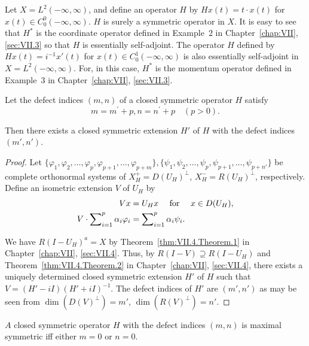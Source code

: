\begin{example}\label{ex:XI.15.Example.2} Let $X = L^2(-\infty, \infty)$, and define an operator $H$ by $Hx(t) = t \cdot x(t)$ for $x(t) \in C_0^0(-\infty, \infty)$. $H$ is surely a symmetric operator in $X$. It is easy to see that $H^*$ is the coordinate operator defined in Example~\hyperref[ex:VII.3.Example.2]{$2$} in Chapter~\ref{chap:VII}, \ref{sec:VII.3} so that $H$ is essentially self-adjoint. The operator $H$ defined by $Hx(t) = i^{-1}x'(t)$ for $x(t) \in C_0^1(-\infty, \infty)$ is also essentially self-adjoint in $X = L^2(-\infty, \infty)$. For, in this case, $H^*$ is the momentum operator defined in Example~\hyperref[ex:VII.3.Example.3]{$3$} in Chapter~\ref{chap:VII}, \ref{sec:VII.3}. 
\end{example}

\begin{theorem}\label{thm:XI.15.Theorem.1} Let the defect indices $(m, n)$ of a closed symmetric operator $H$ satisfy 
\[
m = m ^{\prime} + p, n = n ^{\prime} + p \quad (p > 0).
\]
\end{theorem}

Then there exists a closed symmetric extension $H'$ of $H$ with the defect indices $(m', n')$. 

\begin{proof}
 Let $\{\varphi_1, \varphi_2, \ldots, \varphi_p, \varphi_{p+1}, \ldots, \varphi_{p+m}\}, \{\psi_1, \psi_2, \ldots, \psi_p, \psi_{p+1}, \ldots, \psi_{p+n'}\}$ be complete orthonormal systems of $X_H^+ = D(U_H)^\perp$, $X_H^- = R(U_H)^\perp$, respectively. Define an isometric extension $V$ of $U_H$ by 
\begin{align}
V x& = U _{H} x \quad \text{ for } \quad x \in D (U _{H}), \notag \\
V \cdot \sum\limits_{i=1} ^{p} \alpha_{i} \varphi_{i}& = \sum\limits_{i=1} ^{p} \alpha_{i} \psi_{i}. \notag
\end{align}

We have $R(I - U_{H})^{a} = X$ by Theorem~\ref{thm:VII.4.Theorem.1} in Chapter~\ref{chap:VII}, \ref{sec:VII.4}. Thus, by $R(I - V) \supseteq R(I - U_{H})$ and Theorem~\ref{thm:VII.4.Theorem.2} in Chapter~\ref{chap:VII}, \ref{sec:VII.4}, there exists a uniquely determined closed symmetric extension $H'$ of $H$ such that $V = (H' - iI)(H' + iI)^{-1}$. The defect indices of $H'$ are $(m', n')$ as may be seen from $\dim(D(V)^{\perp}) = m'$, $\dim(R(V)^{\perp}) = n'$. 
\end{proof}

\begin{corollaryu} $A$ closed symmetric operator $H$ with the defect indices $(m, n)$ is maximal symmetric iff either $m = 0$ or $n = 0$. 
\end{corollaryu}

